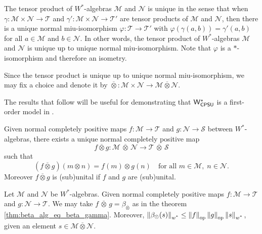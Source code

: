 \begin{proposition} \cite[Exercise 114 II]{westerbaanCategoryNeumannAlgebras2019} \label{prop:tenso_w_unique}
   The tensor product of $W^*$-algebras $\mathscr{M}$ and $\mathscr{N}$ is unique in the sense that when $\gamma \colon \mathscr{M} \times \mathscr{N} \to \mathscr{T}$ and $\gamma' \colon \mathscr{M} \times \mathscr{N} \to \mathscr{T'}$ are tensor products of $\mathscr{M}$ and $\mathscr{N}$, then there is a unique normal miu-isomorphism $\varphi \colon \mathscr{T} \to \mathscr{T'}$ with $\varphi(\gamma(a,b)) = \gamma'(a,b)$ for all $a \in \mathscr{M}$ and $b \in \mathscr{N}$. In other words, the tensor product of $W^*$-algebras $\mathscr{M}$ and $\mathscr{N}$ is unique up to unique normal miu-isomorphism. Note that $\varphi$ is a $*$-isomorphism and therefore an isometry.
\end{proposition}

Since the tensor product is unique up to unique normal miu-isomorphism, we may fix a choice and denote it by 
$\overline{\otimes} \colon \mathscr{M} \times \mathscr{N} \to \mathscr{M} \mathbin{\overline{\otimes}} \mathscr{N}.$

The results that follow will be useful for demonstrating that $\mathsf{W^*_{CPSU}}$ is a first-order model in .


\begin{proposition} \cite[Proposition 115 II]{westerbaanCategoryNeumannAlgebras2019} \label{prop:mapa_tensor_w_u_ncpsu}
Given normal completely positive  maps \( f : \mathscr{M} \to \mathscr{T} \) and \( g : \mathscr{N} \to \mathcal{S} \) between $W^*$-algebras, there exists a unique normal completely positive map
\[
f \overline{\otimes} g: \mathscr{M} \,\overline{\otimes}\, \mathscr{N} \to \mathscr{T} \,\overline{\otimes}\, \mathscr{S}
\]
such that
\[
(f \overline{\otimes} g)(m \otimes n) = f(m) \otimes g(n)
\quad \text{for all } m \in \mathscr{M},\; n \in \mathscr{N}.
\]
Moreover \( f \overline{\otimes} g \) is (sub)unital if \( f \) and \( g \) are (sub)unital.
\end{proposition}

\begin{proposition} \cite[Proof 115 III] {westerbaanCategoryNeumannAlgebras2019} \label{prop:norm_beta_alg}
  Let  $\mathscr{M}$ and $\mathscr{N}$ be $W^*$-algebras.
  Given normal completely positive maps $f:\mathscr{M} \to \mathscr{T}$ and $g:\mathscr{N} \to \mathscr{T}$. We may take $ f \, \overline{\otimes} \, g = \beta_{\bar{\otimes}}$ as in the theorem \autoref{thm:beta_alg_eq_beta_gamma}. Moreover, $\left\lVert \beta_\odot(s) \right\rVert_{\text{$w^*$}} \leq \left\lVert f \right\rVert_{\text{op}}\left\lVert g \right\rVert_{\text{op}}\left\lVert s \right\rVert_{\text{$w^*$}}$, given an element $s\in \mathscr{M} \overline{\otimes} \mathscr{N}$.
\end{proposition}


